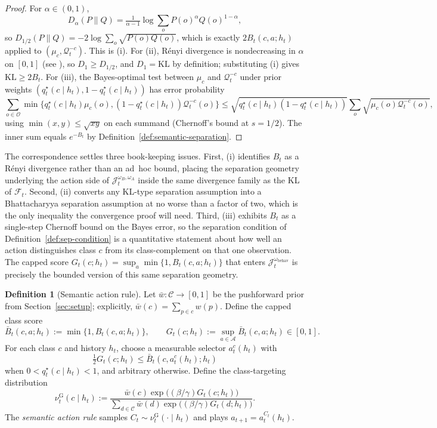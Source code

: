 \documentclass[11pt]{article}
\theoremstyle{definition}
\newtheorem{definition}[theorem]{Definition}
\theoremstyle{remark}
\newcommand{\Acal}{\mathcal{A}}
\newcommand{\Ccal}{\mathcal{C}}
\newcommand{\Ocal}{\mathcal{O}}
\newcommand{\Qcal}{\mathcal{Q}}
\newcommand{\KL}{\mathrm{KL}}
\begin{document}
\begin{proof}
For $\alpha\in(0,1)$,
\[
D_\alpha(P\|Q)=\tfrac{1}{\alpha-1}\log\sum_o P(o)^\alpha Q(o)^{1-\alpha},
\]
so $D_{1/2}(P\|Q)=-2\log\sum_o\sqrt{P(o)Q(o)}$, which is exactly $2B_t(c,a;h_t)$ applied to $(\mu_c,\Qcal_t^{-c})$. This is (i). For (ii), R\'enyi divergence is nondecreasing in $\alpha$ on $[0,1]$ (see \citealp[Thm.~3]{vanErvenHarremoes2014}), so $D_1\ge D_{1/2}$, and $D_1=\KL$ by definition; substituting (i) gives $\KL\ge 2B_t$. For (iii), the Bayes-optimal test between $\mu_c$ and $\Qcal_t^{-c}$ under prior weights $(q_t^\star(c\mid h_t),1-q_t^\star(c\mid h_t))$ has error probability
\[
\sum_{o\in\Ocal}\min\!\bigl\{q_t^\star(c\mid h_t)\mu_c(o),(1-q_t^\star(c\mid h_t))\Qcal_t^{-c}(o)\bigr\}
\le
\sqrt{q_t^\star(c\mid h_t)(1-q_t^\star(c\mid h_t))}\sum_o\sqrt{\mu_c(o)\Qcal_t^{-c}(o)},
\]
using $\min(x,y)\le\sqrt{xy}$ on each summand (Chernoff's bound at $s=1/2$). The inner sum equals $e^{-B_t}$ by Definition~\ref{def:semantic-separation}.
\end{proof}

The correspondence settles three book-keeping issues. First, (i) identifies $B_t$ as a R\'enyi divergence rather than an ad~hoc bound, placing the separation geometry underlying the action side of $\mathcal J_t^{\omega_B,\omega_A}$ inside the same divergence family as the KL of $\mathcal F_t$. Second, (ii) converts any KL-type separation assumption into a Bhattacharyya separation assumption at no worse than a factor of two, which is the only inequality the convergence proof will need. Third, (iii) exhibits $B_t$ as a single-step Chernoff bound on the Bayes error, so the separation condition of Definition~\ref{def:sep-condition} is a quantitative statement about how well an action distinguishes class $c$ from its class-complement on that one observation. The capped score $G_t(c;h_t)=\sup_a\min\{1,B_t(c,a;h_t)\}$ that enters $\mathcal J_t^{\omega_{\mathrm{behav}}}$ is precisely the bounded version of this same separation geometry.

\begin{definition}[Semantic action rule]
\label{def:semantic-rule}
Let $\bar w:\Ccal\to[0,1]$ be the pushforward prior from Section~\ref{sec:setup}; explicitly, $\bar w(c)=\sum_{p\in c}w(p)$. Define the capped class score
\[
\bar B_t(c,a;h_t):=\min\!\bigl\{1,B_t(c,a;h_t)\bigr\},
\qquad
G_t(c;h_t):=\sup_{a\in\Acal}\bar B_t(c,a;h_t)\in[0,1].
\]
For each class $c$ and history $h_t$, choose a measurable selector $a_t^c(h_t)$ with
\[
\tfrac{1}{2}G_t(c;h_t)
\le
\bar B_t(c,a_t^c(h_t);h_t)
\]
when $0<q_t^\star(c\mid h_t)<1$, and arbitrary otherwise. Define the class-targeting distribution
\[
\nu_t^{\mathrm G}(c\mid h_t)
:=
\frac{\bar w(c)\exp\!\bigl((\beta/\gamma)G_t(c;h_t)\bigr)}
{\sum_{d\in\Ccal}\bar w(d)\exp\!\bigl((\beta/\gamma)G_t(d;h_t)\bigr)}.
\]
The \emph{semantic action rule} samples $C_t\sim\nu_t^{\mathrm G}(\cdot\mid h_t)$ and plays $a_{t+1}=a_t^{C_t}(h_t)$.
\end{definition}
\end{document}
